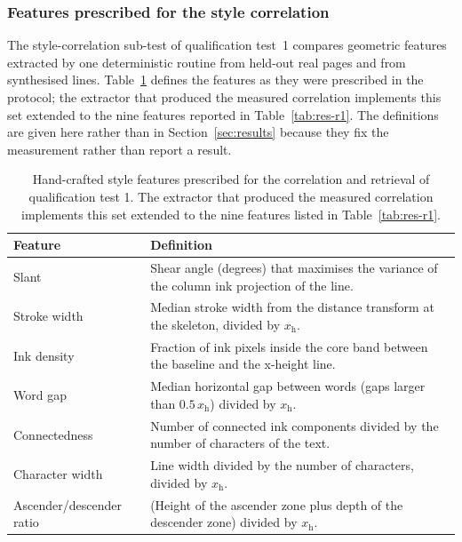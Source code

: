 \subsubsection{Features prescribed for the style correlation}

The style-correlation sub-test of qualification test~1 compares geometric features extracted by one deterministic routine from held-out real pages and from synthesised lines.
Table~\ref{tab:res-features} defines the features as they were prescribed in the protocol; the extractor that produced the measured correlation implements this set extended to the nine features reported in Table~\ref{tab:res-r1}.
The definitions are given here rather than in Section~\ref{sec:results} because they fix the measurement rather than report a result.

\begin{table}[h]
\centering
\fontsize{10}{12}\selectfont
\begin{tabularx}{\linewidth}{|>{\raggedright\arraybackslash}p{3.3cm}|X|}
\hline
\textbf{Feature} & \textbf{Definition} \\
\hline
Slant & Shear angle (degrees) that maximises the variance of the column ink projection of the line. \\
\hline
Stroke width & Median stroke width from the distance transform at the skeleton, divided by $x_{\mathrm{h}}$. \\
\hline
Ink density & Fraction of ink pixels inside the core band between the baseline and the x-height line. \\
\hline
Word gap & Median horizontal gap between words (gaps larger than $0.5\,x_{\mathrm{h}}$) divided by $x_{\mathrm{h}}$. \\
\hline
Connectedness & Number of connected ink components divided by the number of characters of the text. \\
\hline
Character width & Line width divided by the number of characters, divided by $x_{\mathrm{h}}$. \\
\hline
Ascender/descender ratio & (Height of the ascender zone plus depth of the descender zone) divided by $x_{\mathrm{h}}$. \\
\hline
\end{tabularx}
\caption{Hand-crafted style features prescribed for the correlation and retrieval of qualification test 1. The extractor that produced the measured correlation implements this set extended to the nine features listed in Table~\ref{tab:res-r1}.}
\label{tab:res-features}
\end{table}

